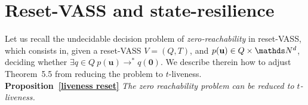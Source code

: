 

\section{Reset-VASS and state-resilience}\label{appendix}







Let us recall the undecidable \cite{araki1976PN} decision problem of {\em zero-reachability} in reset-VASS, which consists in, given a
reset-VASS $V=(Q,T)$, and $p(\textbf{u}) \in Q \times \N^d$,
deciding whether $\exists q \in Q ~ p(\textbf{u}) \to^* q(\textbf{0})$.
We describe therein how to adjust Theorem~5.5 from \cite{peterson1981petri} reducing the problem to {\sc $t$-liveness}. \\

\noindent
\textbf{Proposition~\ref{liveness reset}}
{\em The  zero reachability problem can be reduced to {\sc $t$-liveness}.}



